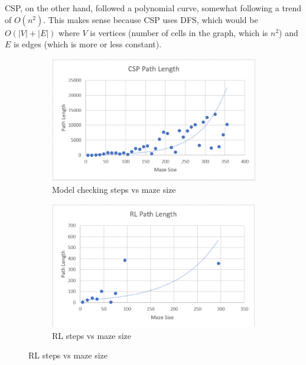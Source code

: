 \documentclass{article}
\newcommand\tab[1][1cm]{\hspace*{#1}}
\begin{document}
         \tab CSP, on the other hand, followed a polynomial curve, somewhat 
         following a trend of $O(n^2)$. This makes sense because CSP 
         uses DFS, which would be $O(|V|+|E|)$ where $V$ is vertices (number 
         of cells in the graph, which is $n^2$) and $E$ is edges (which is 
         more or less constant).

        \begin{figure}[ht]
            \begin{subfigure}{.5\textwidth}
                \centering
                \includegraphics[scale=0.5]{assets/CSPPathVsSize.PNG}
                \caption{Model checking steps vs maze size}
            \end{subfigure}
            \begin{subfigure}{.5\textwidth}
                \centering
                \includegraphics[scale=0.5]{assets/RLPathVsSize.PNG}
                \caption{RL steps vs maze size}
            \end{subfigure}
        \end{figure}
\end{document}
